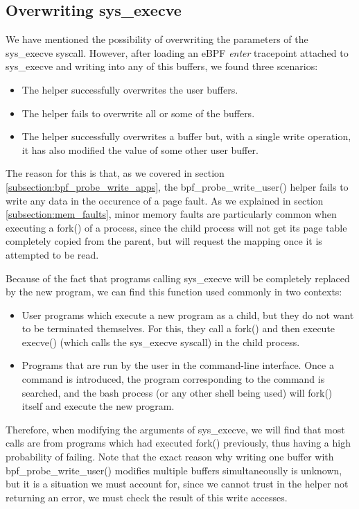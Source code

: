 \subsection{Overwriting sys\_execve}
We have mentioned the possibility of overwriting the parameters of the sys\_execve syscall. However, after loading an eBPF \textit{enter} tracepoint attached to sys\_execve and writing into any of this buffers, we found three scenarios:
\begin{itemize}
\item The helper successfully overwrites the user buffers.
\item The helper fails to overwrite all or some of the buffers.
\item The helper successfully overwrites a buffer but, with a single write operation, it has also modified the value of some other user buffer.
\end{itemize}

The reason for this is that, as we covered in section \ref{subsection:bpf_probe_write_apps}, the bpf\_probe\_write\_user() helper fails to write any data in the occurence of a page fault. As we explained in section \ref{subsection:mem_faults}, minor memory faults are particularly common when executing a fork() of a process, since the child process will not get its page table completely copied from the parent, but will request the mapping once it is attempted to be read.

Because of the fact that programs calling sys\_execve will be completely replaced by the new program, we can find this function used commonly in two contexts:
\begin{itemize}
\item User programs which execute a new program as a child, but they do not want to be terminated themselves. For this, they call a fork() and then execute execve() (which calls the sys\_execve syscall) in the child process.
\item Programs that are run by the user in the command-line interface. Once a command is introduced, the program corresponding to the command is searched, and the bash process (or any other shell being used) will fork() itself and execute the new program.
\end{itemize}

Therefore, when modifying the arguments of sys\_execve, we will find that most calls are from programs which had executed fork() previously, thus having a high probability of failing. Note that the exact reason why writing one buffer with bpf\_probe\_write\_user() modifies multiple buffers simultaneouslly is unknown, but it is a situation we must account for, since we cannot trust in the helper not returning an error, we must check the result of this write accesses.

